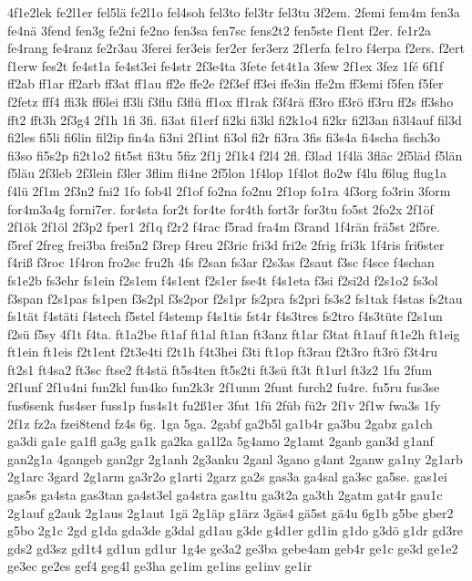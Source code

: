 {4f1e2lek
fe2l1er
fel5lä
fe2l1o
fel4soh
fel3to
fel3tr
fel3tu
3f2em.
2femi
fem4m
fen3a
fe4nä
3fend
fen3g
fe2ni
fe2no
fen3sa
fen7sc
fens2t2
fen5ste
f1ent
f2er.
fe1r2a
fe4rang
fe4ranz
fe2r3au
3ferei
fer3eis
fer2er
fer3erz
2f1erfa
fe1ro
f4erpa
f2ers.
f2ert
f1erw
fes2t
fe4st1a
fe4st3ei
fe4str
2f3e4ta
3fete
fet4t1a
3few
2f1ex
3fez
1fé
6f1f
ff2ab
ff1ar
ff2arb
ff3at
ff1au
ff2e
ffe2e
f2f3ef
ff3ei
ffe3in
ffe2m
ff3emi
f5fen
f5fer
f2fetz
fff4
ffi3k
ff6lei
ff3li
f3flu
f3flü
ff1ox
ff1rak
f3f4rä
ff3ro
ff3rö
ff3ru
ff2s
ff3sho
fft2
fft3h
2f3g4
2f1h
1fi
3fi.
fi3at
fi1erf
fi2ki
fi3kl
fi2k1o4
fi2kr
fi2l3an
fi3l4auf
fil3d
fi2les
fi5li
fi6lin
fil2ip
fin4a
fi3ni
2f1int
fi3ol
fi2r
fi3ra
3fis
fi3s4a
fi4scha
fisch3o
fi3so
fi5s2p
fi2t1o2
fit5st
fi3tu
5fiz
2f1j
2f1k4
f2l4
2fl.
f3lad
1f4lä
3fläc
2f5läd
f5län
f5läu
2f3leb
2f3lein
f3ler
3flim
fli4ne
2f5lon
1f4lop
1f4lot
flo2w
f4lu
f6lug
flug1a
f4lü
2f1m
2f3n2
fni2
1fo
fob4l
2f1of
fo2na
fo2nu
2f1op
fo1ra
4f3org
fo3rin
3form
for4m3a4g
forni7er.
for4sta
for2t
for4te
for4th
fort3r
for3tu
fo5st
2fo2x
2f1öf
2f1ök
2f1öl
2f3p2
fper1
2f1q
f2r2
f4rac
f5rad
fra4m
f3rand
1f4rän
frä5st
2f5re.
f5ref
2freg
frei3ba
frei5n2
f3rep
f4reu
2f3ric
fri3d
fri2e
2frig
fri3k
1f4ris
fri6ster
f4riß
f3roc
1f4ron
fro2sc
fru2h
4fs
f2san
fs3ar
f2s3as
f2saut
f3sc
f4sce
f4schan
fs1e2b
fs3ehr
fs1ein
f2s1em
f4s1ent
f2s1er
fse4t
f4s1eta
f3si
f2si2d
f2s1o2
fs3ol
f3span
f2s1pas
fs1pen
f3s2pl
f3s2por
f2s1pr
fs2pra
fs2pri
fs3s2
fs1tak
f4stas
fs2tau
fs1tät
f4stäti
f4stech
f5stel
f4stemp
f4s1tis
fst4r
f4s3tres
fs2tro
f4s3tüte
f2s1un
f2sü
f5sy
4f1t
f4ta.
ft1a2be
ft1af
ft1al
ft1an
ft3anz
ft1ar
f3tat
ft1auf
ft1e2h
ft1eig
ft1ein
ft1eis
f2t1ent
f2t3e4ti
f2t1h
f4t3hei
f3ti
ft1op
ft3rau
f2t3ro
ft3rö
f3t4ru
ft2s1
ft4sa2
ft3sc
ftse2
ft4stä
ft5s4ten
ft5s2ti
ft3sü
ft3t
ft1url
ft3z2
1fu
2fum
2f1unf
2f1u4ni
fun2kl
fun4ko
fun2k3r
2f1unm
2funt
furch2
fu4re.
fu5ru
fus3se
fus6senk
fus4ser
fuss1p
fus4s1t
fu2ß1er
3fut
1fü
2füb
fü2r
2f1v
2f1w
fwa3s
1fy
2f1z
fz2a
fzei8tend
fz4s
6g.
1ga
5ga.
2gabf
ga2b5l
ga1b4r
ga3bu
2gabz
ga1ch
ga3di
ga1e
ga1fl
ga3g
ga1k
ga2ka
ga1l2a
5g4amo
2g1amt
2ganb
gan3d
g1anf
gan2g1a
4gangeb
gan2gr
2g1anh
2g3anku
2ganl
3gano
g4ant
2ganw
ga1ny
2g1arb
2g1arc
3gard
2g1arm
ga3r2o
g1arti
2garz
ga2s
gas3a
ga4sal
ga3sc
ga5se.
gas1ei
gas5s
ga4sta
gas3tan
ga4st3el
ga4stra
gas1tu
ga3t2a
ga3th
2gatm
gat4r
gau1c
2g1auf
g2auk
2g1aus
2g1aut
1gä
2g1äp
g1ärz
3gäs4
gä5st
gä4u
6g1b
g5be
gber2
g5bo
2g1c
2gd
g1da
gda3de
g3dal
gd1au
g3de
g4d1er
gd1in
g1do
g3dö
g1dr
gd3re
gds2
gd3sz
gd1t4
gd1un
gd1ur
1g4e
ge3a2
ge3ba
gebe4am
geb4r
ge1c
ge3d
ge1e2
ge3ec
ge2es
gef4
geg4l
ge3ha
ge1im
ge1ins
ge1inv
ge1ir
}
